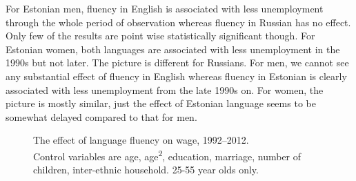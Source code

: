 \documentclass[12pt, a4paper]{article}
\newcommand{\modelTwo}{age, age\textsuperscript{2}, education, marriage, number of children, inter-ethnic household}
\newcommand{\agerestrictions}{25-55 year olds only.}
\begin{document}
For Estonian men, fluency in English is associated with less unemployment through the whole
period of observation whereas fluency in Russian has no effect.
Only few of the results are point wise statistically significant though.
For Estonian women, both languages are associated with less
unemployment in the 1990s but not later. The picture is different for
Russians. For men, we cannot see any substantial effect of fluency in English
whereas fluency in Estonian is clearly associated with less unemployment from
the late 1990s on. For women, the picture is mostly similar, just the
effect of Estonian language seems to be somewhat delayed compared to
that for men.

\begin{figure}[htb]
	\centering
	\caption{The effect of language fluency on wage, 1992--2012. \\ Control variables are \modelTwo. \agerestrictions}
	\label{fig:long-run_wage}
\end{figure}
\end{document}
